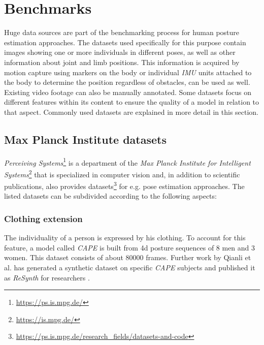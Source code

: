 \section{Benchmarks}
Huge data sources are part of the benchmarking process for human posture estimation approaches. The datasets used specifically for this purpose contain images showing one or more individuals in different poses, as well as other information about joint and limb positions. This information is acquired by motion capture using markers on the body or individual \emph{IMU} units attached to the body to determine the position regardless of obstacles, can be used as well. Existing video footage can also be manually annotated. Some datasets focus on different features within its content to ensure the quality of a model in relation to that aspect. Commonly used datasets are explained in more detail in this section.

\subsection{Max Planck Institute datasets}
\emph{Perceiving Systems}\footnote{\url{https://ps.is.mpg.de/}} is a department of the \emph{Max Planck Institute for Intelligent Systems}\footnote{\url{https://is.mpg.de/}} that is specialized in computer vision and, in addition to scientific publications, also provides datasets\footnote{\url{https://ps.is.mpg.de/research_fields/datasets-and-code}} for e.g. pose estimation approaches. The listed datasets can be subdivided according to the following aspects:

\subsubsection{Clothing extension}
The individuality of a person is expressed by his clothing. To account for this feature, a model called \emph{CAPE} is built from 4d posture sequences of 8 men and 3 women. This dataset consists of about 80000 frames. \cite{cape}
Further work by Qianli et al. has generated a synthetic dataset on specific \emph{CAPE} subjects and published it as \emph{ReSynth} for researchers \cite{resynth}.


